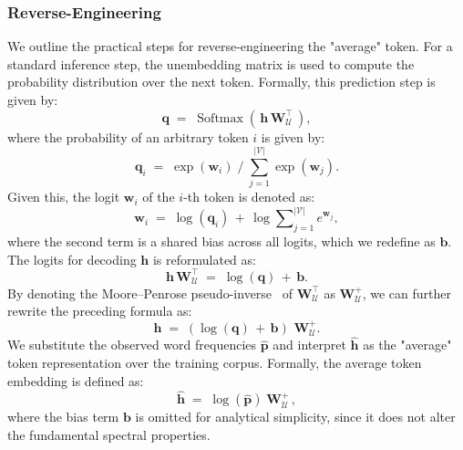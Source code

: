 \documentclass{llmxive}
\providecommand{\bm}[1]{\boldsymbol{#1}}
\providecommand{\vb}{{\bm{b}}}
\providecommand{\vh}{{\bm{h}}}
\providecommand{\vp}{{\bm{p}}}
\providecommand{\vq}{{\bm{q}}}
\providecommand{\vw}{{\bm{w}}}
\providecommand{\mW}{{\bm{W}}}
\begin{document}
\subsubsection{Reverse-Engineering}
We outline the practical steps for reverse-engineering the "average" token.
For a standard inference step, the unembedding matrix is used to compute the probability distribution over the next token.
Formally, this prediction step is given by:
{\Large \begin{equation*}
    \vq \; = \; \operatorname{Softmax} \left( \, \vh \, \mW_\mathcal{U}^\top \, \right),
\end{equation*}}
where the probability of an arbitrary token \(i\) is given by:
{\Large \begin{equation*}
    \vq_i \; = \; \exp(\vw_i) \; \big/ \; {\textstyle \sum_{j=1}^{|\mathcal{V}|}} \exp(\vw_j).
\end{equation*}}
Given this, the logit $\vw_i$ of the \(i\)-th token is denoted as:
{\Large \[
    \vw_i \; = \; \log(\vq_i) \, + \, \log \sum\nolimits_{j=1}^{|\mathcal{V}|} e^{\vw_j},
\]}
where the second term is a shared bias across all logits, which we redefine as $\vb$.
The logits for decoding \(\vh\) is reformulated as:
{\Large \[
    \vh \, \mW_\mathcal{U}^\top \; = \; \log(\vq) \, + \, \vb.
\]}
By denoting the Moore–Penrose pseudo-inverse~\cite{inverse} of \(\mW_\mathcal{U}^\top\) as \(\mW_\mathcal{U}^{+}\), we can further rewrite the preceding formula as:
{\Large \[
    \vh \; = \; \left( \log(\vq) \, + \, \vb \right) \, \, \mW_\mathcal{U}^{+}.
\]}
We substitute the observed word frequencies \(\hat{\vp}\) and interpret \(\hat{\vh}\) as the "average" token representation over the training corpus.
Formally, the average token embedding is defined as:
{\Large \[
    \hat{\vh} \; = \; \log(\hat{\vp}) \; \mW_{\mathcal{U}}^+ \,,
\]}
where the bias term $\vb$ is omitted for analytical simplicity, since it does not alter the fundamental spectral properties.
\end{document}
